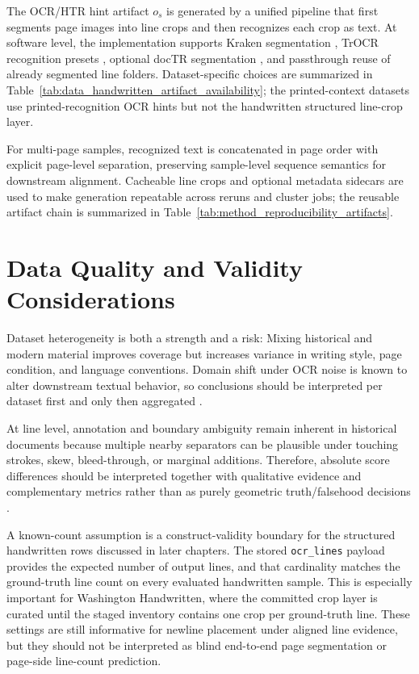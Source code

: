 The OCR/HTR hint artifact $o_s$ is generated by a unified pipeline that first segments page images into line crops and then recognizes each crop as text. At software level, the implementation supports Kraken segmentation , TrOCR recognition presets , optional docTR segmentation , and passthrough reuse of already segmented line folders. Dataset-specific choices are summarized in Table~\ref{tab:data_handwritten_artifact_availability}; the printed-context datasets use printed-recognition OCR hints but not the handwritten structured line-crop layer.

For multi-page samples, recognized text is concatenated in page order with explicit page-level separation, preserving sample-level sequence semantics for downstream alignment. Cacheable line crops and optional metadata sidecars are used to make \OCRHTR generation repeatable across reruns and cluster jobs; the reusable artifact chain is summarized in Table~\ref{tab:method_reproducibility_artifacts}.

\section{Data Quality and Validity Considerations}
\label{sec:data_threats}

Dataset heterogeneity is both a strength and a risk: Mixing historical and modern material improves coverage but increases variance in writing style, page condition, and language conventions. Domain shift under OCR noise is known to alter downstream textual behavior, so conclusions should be interpreted per dataset first and only then aggregated .

At line level, annotation and boundary ambiguity remain inherent in historical documents because multiple nearby separators can be plausible under touching strokes, skew, bleed-through, or marginal additions. Therefore, absolute score differences should be interpreted together with qualitative evidence and complementary metrics rather than as purely geometric truth/falsehood decisions .

A known-count assumption is a construct-validity boundary for the structured handwritten rows discussed in later chapters. The stored \texttt{ocr\_lines} payload provides the expected number of output lines, and that cardinality matches the ground-truth line count on every evaluated handwritten sample. This is especially important for Washington Handwritten, where the committed crop layer is curated until the staged inventory contains one crop per ground-truth line. These settings are still informative for newline placement under aligned line evidence, but they should not be interpreted as blind end-to-end page segmentation or page-side line-count prediction.


